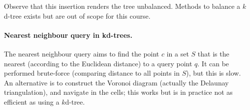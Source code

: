 Observe that this insertion renders the tree unbalanced.
Methods to balance a $k$d-tree exists but are out of scope for this course.


\paragraph{Nearest neighbour query in kd-trees.}%
\label{sec:knn}

The nearest neighbour query aims to find the point $c$ in a set $S$ that is the nearest (according to the Euclidean distance) to a query point $q$.
It can be performed brute-force (comparing distance to all points in $S$), but this is slow.
An alternative is to construct the Voronoi diagram (actually the Delaunay triangulation), and navigate in the cells; this works but is in practice not as efficient as using a $k$d-tree.


%

